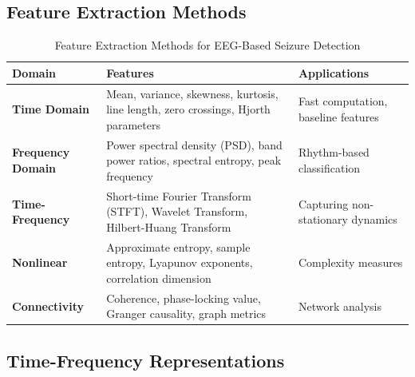 \documentclass[12pt,a4paper]{article}
\begin{document}
\subsection{Feature Extraction Methods}

\begin{table}[H]
\centering
\caption{Feature Extraction Methods for EEG-Based Seizure Detection}
\label{tab:features}
\begin{tabular}{lp{4.5cm}p{4.5cm}}
\toprule
\textbf{Domain} & \textbf{Features} & \textbf{Applications} \\
\midrule
\textbf{Time Domain} & Mean, variance, skewness, kurtosis, line length, zero crossings, Hjorth parameters & Fast computation, baseline features \\
\midrule
\textbf{Frequency Domain} & Power spectral density (PSD), band power ratios, spectral entropy, peak frequency & Rhythm-based classification \\
\midrule
\textbf{Time-Frequency} & Short-time Fourier Transform (STFT), Wavelet Transform, Hilbert-Huang Transform & Capturing non-stationary dynamics \\
\midrule
\textbf{Nonlinear} & Approximate entropy, sample entropy, Lyapunov exponents, correlation dimension & Complexity measures \\
\midrule
\textbf{Connectivity} & Coherence, phase-locking value, Granger causality, graph metrics & Network analysis \\
\bottomrule
\end{tabular}
\end{table}

\subsection{Time-Frequency Representations}
\end{document}
